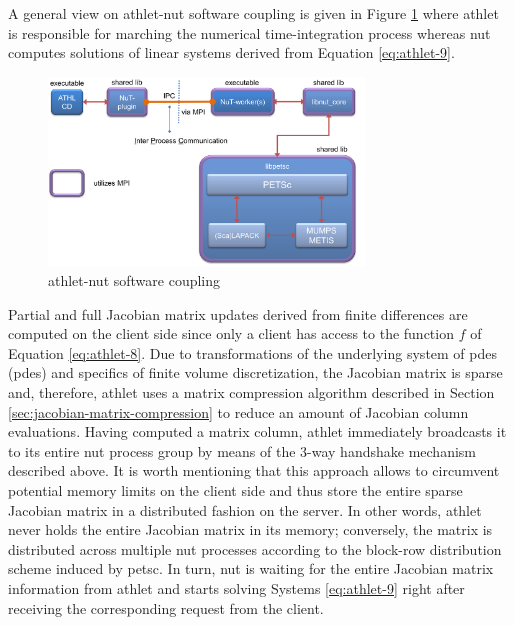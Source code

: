 A general view on \acrshort{athlet}-\acrshort{nut} software coupling is given in Figure \ref{fig:introduction-athlet-nut-coupling} where  \acrshort{athlet} is responsible for marching the numerical time-integration process whereas \acrshort{nut} computes solutions of linear systems derived from Equation \ref{eq:athlet-9}.\\




\figpointer{\ref{fig:introduction-athlet-nut-coupling}}
\begin{figure}
  \centering
  \includegraphics[width=0.75\textwidth]{figures/introduction-athlet-nut-coupling.png}
    \caption{\acrshort{athlet}-\acrshort{nut} software coupling}
\label{fig:introduction-athlet-nut-coupling}
\end{figure}


Partial and full Jacobian matrix updates derived from finite differences are computed on the client side since only a client has access to the function $f$ of Equation \ref{eq:athlet-8}. Due to transformations of the underlying system of \acrlong{pde}s (\acrshort{pde}s) and specifics of finite volume discretization, the Jacobian matrix is sparse and, therefore, \acrshort{athlet} uses a matrix compression algorithm  described in Section \ref{sec:jacobian-matrix-compression} to reduce an amount of Jacobian column evaluations. Having computed a matrix column, \acrshort{athlet} immediately broadcasts it to its entire \acrshort{nut} process group by means of the 3-way handshake mechanism described above. It is worth mentioning that this approach allows to circumvent potential memory limits on the client side and thus store the entire sparse Jacobian matrix in a distributed fashion on the server. In other words, \acrshort{athlet} never holds the entire Jacobian matrix in its memory; conversely, the matrix is distributed across multiple \acrshort{nut} processes according to the block-row distribution scheme induced by \acrshort{petsc}. In turn, \acrshort{nut} is waiting for the entire Jacobian matrix information from \acrshort{athlet} and starts solving Systems \ref{eq:athlet-9} right after receiving the corresponding request from the client.\\


